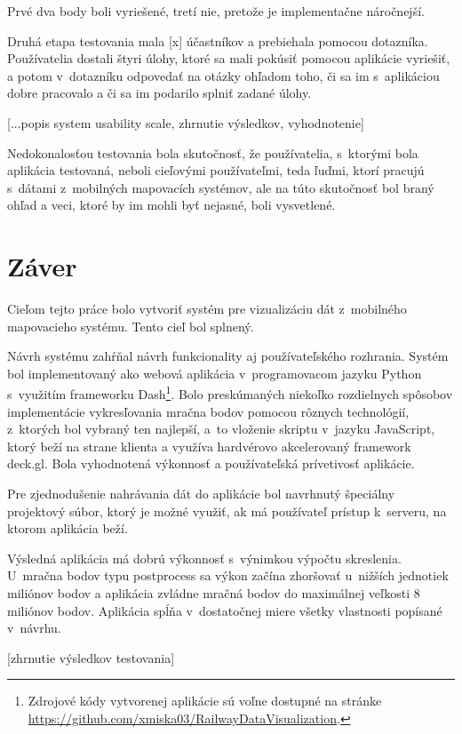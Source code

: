 Prvé dva body boli vyriešené, tretí nie, pretože je implementačne náročnejší.

Druhá etapa testovania mala [x] účastníkov a prebiehala pomocou dotazníka. Používatelia dostali štyri úlohy, ktoré sa mali pokúsiť pomocou aplikácie vyriešiť, a potom v~dotazníku odpovedať na otázky ohľadom toho, či sa im s~aplikáciou dobre pracovalo a či sa im podarilo splniť zadané úlohy.

[...popis system usability scale, zhrnutie výsledkov, vyhodnotenie]

Nedokonalosťou testovania bola skutočnosť, že používatelia, s~ktorými bola aplikácia testovaná, neboli cieľovými používateľmi, teda ľuďmi, ktorí pracujú s~dátami z~mobilných mapovacích systémov, ale na túto skutočnosť bol braný ohľad a veci, ktoré by im mohli byť nejasné, boli vysvetlené.

\chapter{Záver}

Cieľom tejto práce bolo vytvoriť systém pre vizualizáciu dát z~mobilného mapovacieho systému. Tento cieľ bol splnený.

Návrh systému zahŕňal návrh funkcionality aj používateľského rozhrania. Systém bol implementovaný ako webová aplikácia v~programovacom jazyku Python s~využitím frameworku Dash\footnote{Zdrojové kódy vytvorenej aplikácie sú voľne dostupné na stránke \url{https://github.com/xmiska03/RailwayDataVisualization}.}. Bolo preskúmaných niekoľko rozdielnych spôsobov implementácie vykresľovania mračna bodov pomocou rôznych technológií, z~ktorých bol vybraný ten najlepší, a~to vloženie skriptu v~jazyku JavaScript, ktorý beží na strane klienta a využíva hardvérovo akcelerovaný framework deck.gl. Bola vyhodnotená výkonnosť a používateľská prívetivosť aplikácie.

Pre zjednodušenie nahrávania dát do aplikácie bol navrhnutý špeciálny projektový súbor, ktorý je možné využiť, ak má používateľ prístup k~serveru, na ktorom aplikácia beží.

Výsledná aplikácia má dobrú výkonnosť s~výnimkou výpočtu skreslenia. U~mračna bodov typu postprocess sa výkon začína zhoršovať u~nižších jednotiek miliónov bodov a aplikácia zvládne mračná bodov do maximálnej veľkosti 8 miliónov bodov. Aplikácia spĺňa v~dostatočnej miere všetky vlastnosti popísané v~návrhu.

[zhrnutie výsledkov testovania]

